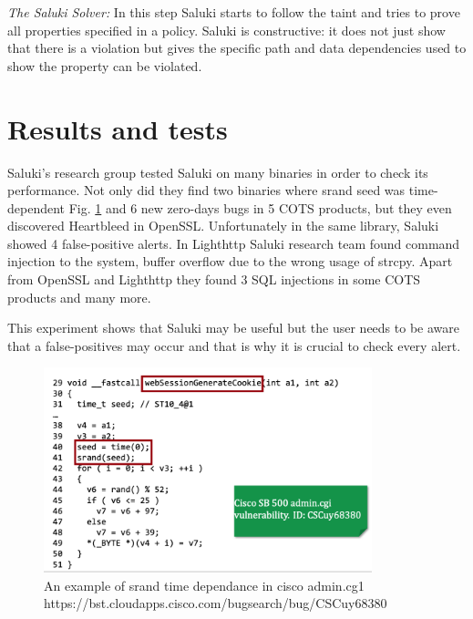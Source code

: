 \documentclass[a4paper, 12pt, journal, onecolumn]{IEEEtran}
\begin{document}
\bigskip
\textit{The Saluki Solver:} In this step Saluki starts to follow the taint and tries to prove all properties specified in a policy. Saluki is constructive: it does not just show that there is a violation but gives the specific path and data dependencies used to show the property can be violated.



\section{Results and tests}

Saluki's research group tested Saluki on many binaries in order to check its performance. Not only did they find two binaries where srand seed was time-dependent Fig. \ref{fig:bug} and 6 new zero-days bugs in 5 COTS products, but they even discovered Heartbleed in OpenSSL. Unfortunately in the same library, Saluki showed 4 false-positive alerts.
In Lighthttp Saluki research team found command injection to the system, buffer overflow due to the wrong usage of strcpy. Apart from OpenSSL and Lighthttp they found 3 SQL injections in some COTS products and many more.


This experiment shows that Saluki may be useful but the user needs to be aware that a false-positives may occur and that is why it is crucial to check every alert. 

\begin{figure}[h]
    \centering
    \captionsetup{justification=centering}
    \includegraphics[width=0.85\textwidth]{bug.png}
    \caption{An example of srand time dependance in cisco admin.cg1\\
    \small{https://bst.cloudapps.cisco.com/bugsearch/bug/CSCuy68380}}
    \label{fig:bug}
\end{figure}
\end{document}
